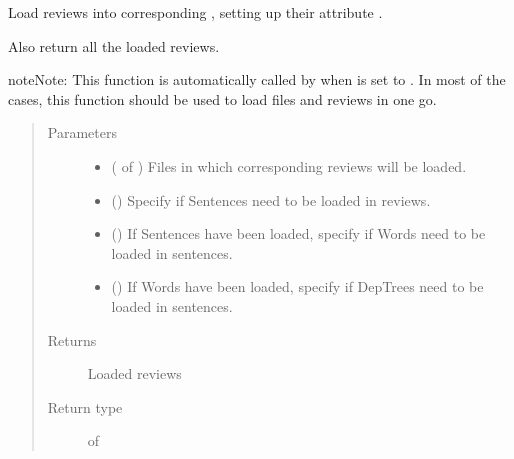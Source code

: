 \documentclass[letterpaper,10pt,english]{sphinxmanual}
\begin{document}
\begin{fulllineitems}
\label{\detokenize{load:loacore.load.review_load.load_reviews_in_files}}
Load reviews into corresponding , setting up their attribute .

Also return all the loaded reviews.

\begin{sphinxadmonition}{note}{Note:}
This function is automatically called by  when  is set to
. In most of the cases, this function should be used to load files and reviews in one go.
\end{sphinxadmonition}
\begin{quote}\begin{description}
\item[{Parameters}] \leavevmode\begin{itemize}
\item {} 
 ( of {\hyperref[\detokenize{classes:loacore.classes.classes.File}]{}}) \textendash{} Files in which corresponding reviews will be loaded.

\item {} 
 () \textendash{} Specify if Sentences need to be loaded in reviews.

\item {} 
 () \textendash{} If Sentences have been loaded, specify if Words need to be loaded in sentences.

\item {} 
 () \textendash{} If Words have been loaded, specify if DepTrees need to be loaded in sentences.

\end{itemize}

\item[{Returns}] \leavevmode
Loaded reviews

\item[{Return type}] \leavevmode
{} of {\hyperref[\detokenize{classes:loacore.classes.classes.Review}]{}}

\end{description}\end{quote}

\end{fulllineitems}
\end{document}
